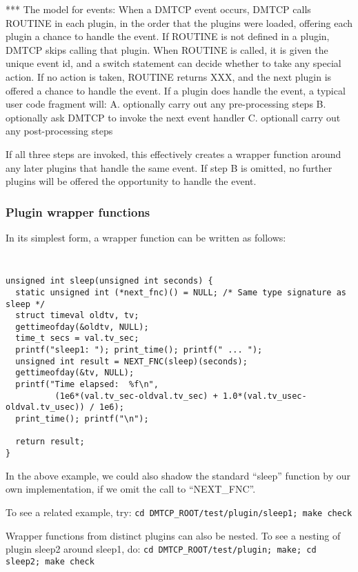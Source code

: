 \documentclass{article}
\begin{document}
*** The model for events:  When a DMTCP event occurs, DMTCP calls ROUTINE
in each plugin, in the order that the plugins were loaded, offering each plugin
a chance to handle the event.  If ROUTINE is not defined in a plugin, DMTCP
skips calling that plugin.  When ROUTINE is called, it is given the unique
event id, and a switch statement can decide whether to take any special action.
If no action is taken, ROUTINE returns XXX, and the next plugin is offered
a chance to handle the event.  If a plugin does handle the event, a typical
user code fragment will:
A.  optionally carry out any pre-processing steps
B.  optionally ask DMTCP to invoke the next event handler
C.  optionall carry out any post-processing steps

If all three steps are invoked, this effectively creates a wrapper function around
any later plugins that handle the same event.  If step B is omitted,
no further plugins will be offered the opportunity to handle the event.

\subsubsection{Plugin wrapper functions}

In its simplest form, a wrapper function can be written as follows:

{\tt
\begin{verbatim}
unsigned int sleep(unsigned int seconds) {
  static unsigned int (*next_fnc)() = NULL; /* Same type signature as sleep */
  struct timeval oldtv, tv;
  gettimeofday(&oldtv, NULL);
  time_t secs = val.tv_sec;
  printf("sleep1: "); print_time(); printf(" ... ");
  unsigned int result = NEXT_FNC(sleep)(seconds);
  gettimeofday(&tv, NULL);
  printf("Time elapsed:  %f\n",
          (1e6*(val.tv_sec-oldval.tv_sec) + 1.0*(val.tv_usec-oldval.tv_usec)) / 1e6);
  print_time(); printf("\n");

  return result;
}
\end{verbatim}
}

In the above example, we could also shadow the standard ``sleep'' function
by our own implementation, if we omit the call to ``{NEXT\_FNC}''.

\noindent
To see a related example, try:
\hfill\break
\medskip\noindent
  \hspace{0.3truein} {\tt cd DMTCP\_ROOT/test/plugin/sleep1; make check}
\medskip

\noindent
Wrapper functions from distinct plugins can also be nested.  To see a nesting
of plugin sleep2 around sleep1, do:
\hfill\break
\medskip\noindent
  \hspace{0.3truein} {\tt cd DMTCP\_ROOT/test/plugin; make; cd sleep2; make check}
\medskip
\end{document}

